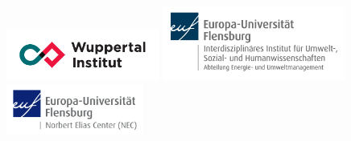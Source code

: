 
\thispagestyle{empty}
\begin{center}

\begin{figure}[htb]
    \centering
    \begin{minipage}[c]{0.3\linewidth}
        \centering
        \includegraphics[width=5cm]{logos/WI_Logo_CMYK.pdf}
    \end{minipage}
    \hfill
    \begin{minipage}[c]{0.35\linewidth}
         \includegraphics[width=6cm]{logos/AbtEUM.JPG}
     \end{minipage}
    \hfill
    \begin{minipage}[l]{0.25\linewidth}
        \includegraphics[width=4.5cm]{logos/NEC_logo.jpg}
    \end{minipage}
\end{figure}

\vspace*{1.5 cm}


\end{center}

